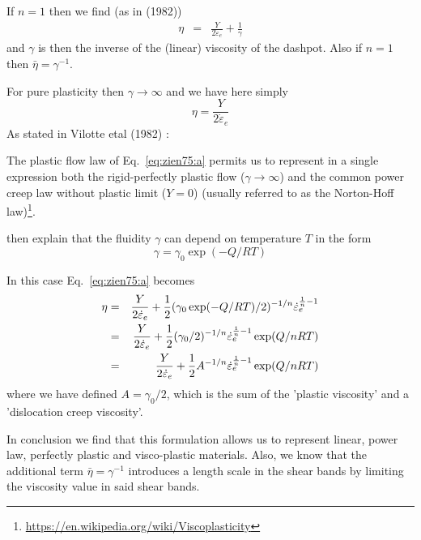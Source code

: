 If $n=1$ then we find (as in \textcite{vidm82} (1982))
\begin{eqnarray}
\eta 
&=& \frac{ Y }{2  \dot\varepsilon_e}
+ \frac{1 }{\gamma } 
\end{eqnarray}
and $\gamma$ is then the inverse of the (linear) viscosity of the dashpot.
Also if $n=1$ then $\bar\eta=\gamma^{-1}$.

For pure plasticity then $\gamma \rightarrow \infty$ and we have here simply
\[
\eta = \frac{Y}{2  \dot\varepsilon_e}
\]
As stated in Vilotte etal (1982) \cite{vidm82}: 
\begin{displayquote}
{\color{darkgray}
The plastic flow law of Eq.~\eqref{eq:zien75:a} permits us to
represent in a single expression both the rigid-perfectly plastic flow
($\gamma\rightarrow \infty$)
and the common power creep law without plastic limit ($Y=0$)
(usually referred to as the Norton-Hoff law)\footnote{\url{https://en.wikipedia.org/wiki/Viscoplasticity}}.}
\end{displayquote}
\textcite{vidm82} then explain that the fluidity $\gamma$ can depend on temperature $T$ in the form 
\[
\gamma = \gamma_0 \exp(-Q/RT)
\]

In this case Eq.~\eqref{eq:zien75:a} becomes
\begin{eqnarray}
\eta 
&=& \frac{ Y }{2  \dot\varepsilon_e} + \frac{1 }{2 } ( \gamma_0 \exp(-Q/RT) /2)^{-1/n}  \dot\varepsilon_e^{\frac1n-1}  \nonumber\\
&=& \frac{ Y }{2  \dot\varepsilon_e} + \frac{1 }{2 } ( \gamma_0 /2)^{-1/n}  \dot\varepsilon_e^{\frac1n-1}  \exp(Q/nRT) \nonumber\\
&=& \frac{ Y }{2  \dot\varepsilon_e} + \frac{1 }{2 } A^{-1/n}  \dot\varepsilon_e^{\frac1n-1}  \exp(Q/nRT) 
\end{eqnarray}
where we have defined $A=\gamma_0/2$,
which is the sum of the 'plastic viscosity' and a 'dislocation creep viscosity'.

In conclusion we find that this formulation allows us to represent linear, power law,
perfectly plastic and visco-plastic materials.
Also, we know that the additional term $\bar\eta=\gamma^{-1}$ introduces a length scale
in the shear bands by limiting the viscosity value in said shear bands.


